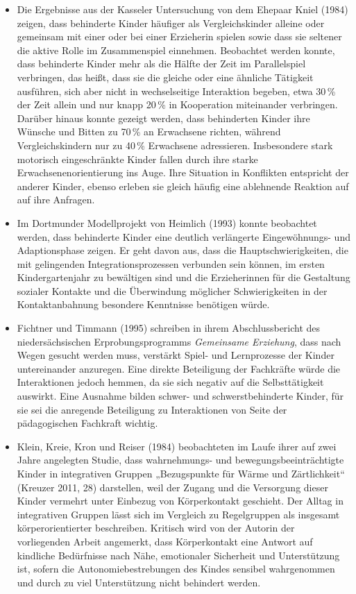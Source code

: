 \begin{itemize}
\item Die Ergebnisse aus der Kasseler Untersuchung von dem Ehepaar Kniel (1984) zeigen, dass behinderte Kinder häufiger als Vergleichskinder alleine oder gemeinsam mit einer oder bei einer Erzieherin spielen sowie dass sie seltener die aktive Rolle im Zusammenspiel einnehmen. Beobachtet werden konnte, dass behinderte Kinder mehr als die Hälfte der Zeit im Parallelspiel verbringen, das heißt, dass sie die gleiche oder eine ähnliche Tätigkeit ausführen, sich aber nicht in wechselseitige Interaktion begeben, etwa 30\,\% der Zeit allein und nur knapp 20\,\% in Kooperation miteinander verbringen. Darüber hinaus konnte gezeigt werden, dass behinderten Kinder ihre Wünsche und Bitten zu 70\,\% an Erwachsene richten, während Vergleichskindern nur zu 40\,\% Erwachsene adressieren. Insbesondere stark motorisch eingeschränkte Kinder fallen durch ihre starke Erwachsenenorientierung ins Auge. Ihre Situation in Konflikten entspricht der anderer Kinder, ebenso erleben sie gleich häufig eine ablehnende Reaktion auf auf ihre Anfragen.

\item Im Dortmunder Modellprojekt von Heimlich (1993) konnte beobachtet werden, dass behinderte Kinder eine deutlich verlängerte Eingewöhnungs- und Adaptions\-phase zeigen. Er geht davon aus, dass die Hauptschwierigkeiten, die mit gelingenden Integrationsprozessen verbunden sein können, im ersten Kindergartenjahr zu bewältigen sind und die Erzieherinnen für die Gestaltung sozialer Kontakte und die Überwindung möglicher Schwierigkeiten in der Kontaktanbahnung besondere Kenntnisse benötigen würde.

\item Fichtner und Timmann (1995) schreiben in ihrem Abschlussbericht des niedersächsischen Erprobungsprogramms \emph{Gemeinsame Erziehung}, dass nach Wegen gesucht werden muss, verstärkt Spiel- und Lernprozesse der Kinder untereinander anzuregen. Eine direkte Beteiligung der Fachkräfte würde die Interaktionen jedoch hemmen, da sie sich negativ auf die Selbsttätigkeit auswirkt. Eine Ausnahme bilden schwer- und schwerstbehinderte Kinder, für sie sei die anregende Beteiligung zu Interaktionen von Seite der pädagogischen Fachkraft wichtig. 

\item Klein, Kreie, Kron und Reiser (1984) beobachteten im Laufe ihrer auf zwei Jahre angelegten Studie, dass wahrnehmungs- und bewegungsbeeinträchtigte Kinder in integrativen Gruppen „Bezugspunkte für Wärme und Zärtlichkeit“ (Kreuzer 2011, 28) darstellen, weil der Zugang und die Versorgung dieser Kinder vermehrt unter Einbezug von Körperkontakt geschieht. Der Alltag in integrativen Gruppen lässt sich im Vergleich zu Regelgruppen als insgesamt körperorientierter beschreiben. Kritisch wird von der Autorin der vorliegenden Arbeit angemerkt, dass Körperkontakt eine Antwort auf kindliche Bedürfnisse nach Nähe, emotionaler Sicherheit und Unterstützung ist, sofern die Autonomiebestrebungen des Kindes sensibel wahrgenommen und durch zu viel Unterstützung nicht behindert werden.  


\end{itemize}
